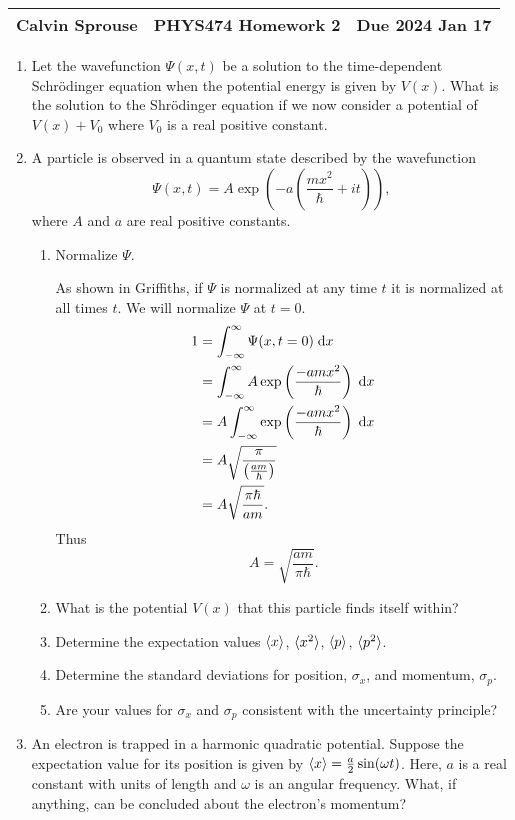 \documentclass[a4paper, 12pt]{config/homework}
\begin{document}
\noindent
\begin{tabularx}{\textwidth}{>{\centering\arraybackslash}X>{\centering\arraybackslash}X>{\centering\arraybackslash}X}
Calvin Sprouse & PHYS474 Homework 2 & Due 2024 Jan 17\\
\midrule
\end{tabularx}

\begin{enumerate}
\item Let the wavefunction \(\Psi(x,t)\) be a solution to the time-dependent Schr{\"o}dinger equation when the potential energy is given by \(V(x)\). What is the solution to the Shr{\"o}dinger equation if we now consider a potential of \(V(x) + V_0\) where \(V_0\) is a real positive constant.

\pagebreak
\item A particle is observed in a quantum state described by the wavefunction
\[\Psi(x,t) = A\exp\left(-a\left(\frac{mx^2}{\hbar}+it\right)\right),\]
where \(A\) and \(a\) are real positive constants.
\begin{enumerate}[label=(\alph*)]
\item Normalize \(\Psi \).

As shown in Griffiths, if \(\Psi\) is normalized at any time \(t\) it is normalized at all times \(t\). We will normalize \(\Psi\) at \(t=0\).
\begin{align*}
1 &= \bint{-\infty}{\infty}{\Psi(x,t=0)}{x}
\\&= \bint{-\infty}{\infty}{A\exp\left(\frac{-amx^2}{\hbar}\right)}{x}
\\&= A \bint{-\infty}{\infty}{\exp\left(\frac{-amx^2}{\hbar}\right)}{x}
\\&= A \sqrt{\frac{\pi}{\left(\frac{am}{\hbar}\right)}}
\\&= A \sqrt{\frac{\pi\hbar}{am}}.
\end{align*}
Thus
\[A = \sqrt{\frac{am}{\pi\hbar}}.\]

\item What is the potential \(V(x)\) that this particle finds itself within?
\item Determine the expectation values \(\braket{x}\), \(\braket{x^2}\), \(\braket{p}\), \(\braket{p^2}\).
\item Determine the standard deviations for position, \(\sigma_x\), and momentum, \(\sigma_p\).
\item Are your values for \(\sigma_x\) and \(\sigma_p\) consistent with the uncertainty principle?
\end{enumerate}

\pagebreak
\item An electron is trapped in a harmonic quadratic potential. Suppose the expectation value for its position is given by \(\braket{x} = \frac{a}{2}\sin(\omega t)\). Here, \(a\) is a real constant with units of length and \(\omega \) is an angular frequency. What, if anything, can be concluded about the electron's momentum?
\end{enumerate}
\end{document}
